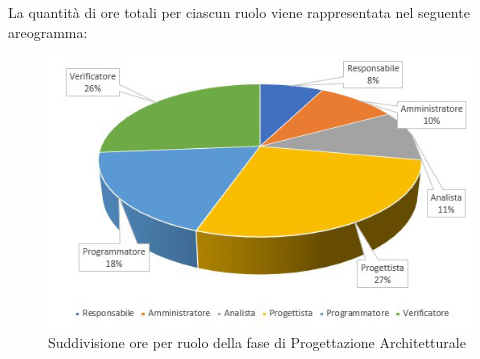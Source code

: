 La quantità di ore totali per ciascun ruolo viene rappresentata nel seguente areogramma:
\begin{figure}[h!]
	\centering
	\includegraphics{Sezioni/Aerogrammi/AerogrammaProgettArchitetturale.png}
	\caption{Suddivisione ore per ruolo della fase di Progettazione Architetturale}
\end{figure}